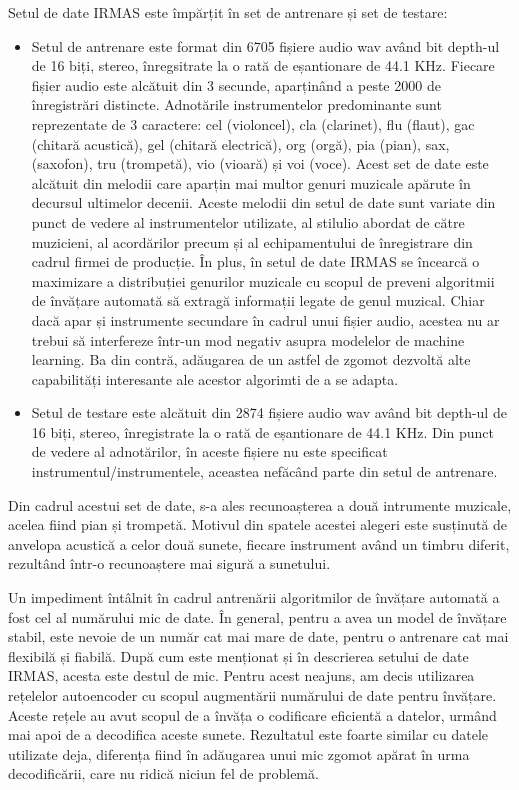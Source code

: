 \documentclass[a4paper,12pt]{report}
\begin{document}
   Setul de date IRMAS este împărțit în set de antrenare și set de testare:
   \begin{itemize}
   	\item Setul de antrenare este format din 6705 fișiere audio wav având bit depth-ul de 16 biți, stereo, înregsitrate la o rată de eșantionare de 44.1 KHz. Fiecare fișier audio este alcătuit din 3 secunde, aparținând a peste 2000 de înregistrări distincte. Adnotările instrumentelor predominante sunt reprezentate de 3 caractere: cel (violoncel), cla (clarinet), flu (flaut), gac (chitară acustică), gel (chitară electrică), org (orgă), pia (pian), sax, (saxofon), tru (trompetă), vio (vioară) și voi (voce). Acest set de date este alcătuit din melodii care aparțin mai multor genuri muzicale apărute în decursul ultimelor decenii. Aceste melodii din setul de date sunt variate din punct de vedere al instrumentelor utilizate, al stilulio abordat de către muzicieni, al acordărilor precum și al echipamentului de înregistrare din cadrul firmei de producție. În plus, în setul de date IRMAS se încearcă o maximizare a distribuției genurilor muzicale cu scopul de preveni algoritmii de învățare automată să extragă informații legate de genul muzical. Chiar dacă apar și instrumente secundare în cadrul unui fișier audio, acestea nu ar trebui să interfereze într-un mod negativ asupra modelelor de machine learning. Ba din contră, adăugarea de un astfel de zgomot dezvoltă alte capabilități interesante ale acestor algorimti de a se adapta.
   	\item Setul de testare este alcătuit din 2874 fișiere audio wav având bit depth-ul de 16 biți, stereo, înregistrate la o rată de eșantionare de 44.1 KHz. Din punct de vedere al adnotărilor, în aceste fișiere nu este specificat instrumentul/instrumentele, aceastea nefăcând parte din setul de antrenare.
   \end{itemize}
	
	Din cadrul acestui set de date, s-a ales recunoașterea a două intrumente muzicale, acelea fiind pian și trompetă. Motivul din spatele acestei alegeri este susținută de anvelopa acustică a celor două sunete, fiecare instrument având un timbru diferit, rezultând într-o recunoaștere mai sigură a sunetului.
	
	Un impediment întâlnit în cadrul antrenării algoritmilor de învățare automată a fost cel al numărului mic de date. În general, pentru a avea un model de învățare stabil, este nevoie de un număr cat mai mare de date, pentru o antrenare cat mai flexibilă și fiabilă. După cum este menționat și în descrierea setului de date IRMAS, acesta este destul de mic. Pentru acest neajuns, am decis utilizarea rețelelor autoencoder cu scopul augmentării numărului de date pentru învățare. Aceste rețele au avut scopul de a învăța o codificare eficientă a datelor, urmând mai apoi de a decodifica aceste sunete. Rezultatul este foarte similar cu datele utilizate deja, diferența fiind în adăugarea unui mic zgomot apărat în urma decodificării, care nu ridică niciun fel de problemă.
	  
\end{document}
